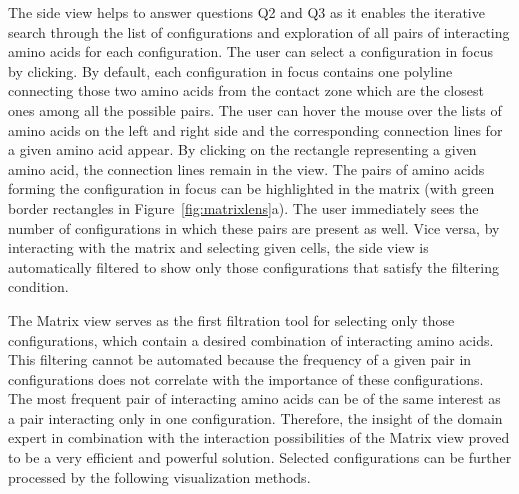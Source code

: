 \documentclass{bmcart}
\def\MatView {Matrix view\xspace}
\begin{document}
The side view helps to answer questions Q2 and Q3 as it enables the iterative search through the list of configurations and exploration of all pairs of interacting amino acids for each configuration.
The user can select a configuration in focus by clicking. 
By default, each configuration in focus contains one polyline connecting those two amino acids from the contact zone which are the closest ones among all the possible pairs.
The user can hover the mouse over the lists of amino acids on the left and right side and the corresponding connection lines for a given amino acid appear.
By clicking on the rectangle representing a given amino acid, the connection lines remain in the view. 
The pairs of amino acids forming the configuration in focus can be highlighted in the matrix (with green border rectangles in Figure~\ref{fig:matrixlens}a).
The user immediately sees the number of configurations in which these pairs are present as well.
Vice versa, by interacting with the matrix and selecting given cells, the side view is automatically filtered to show only those configurations that satisfy the filtering condition.

The \MatView serves as the first filtration tool for selecting only those configurations, which contain a desired combination of interacting amino acids.
This filtering cannot be automated because the frequency of a given pair in configurations does not correlate with the importance of these configurations.
The most frequent pair of interacting amino acids can be of the same interest as a pair interacting only in one configuration.
Therefore, the insight of the domain expert in combination with the interaction possibilities of the \MatView proved to be a very efficient and powerful solution.
Selected configurations can be further processed by the following visualization methods.


\end{document}
